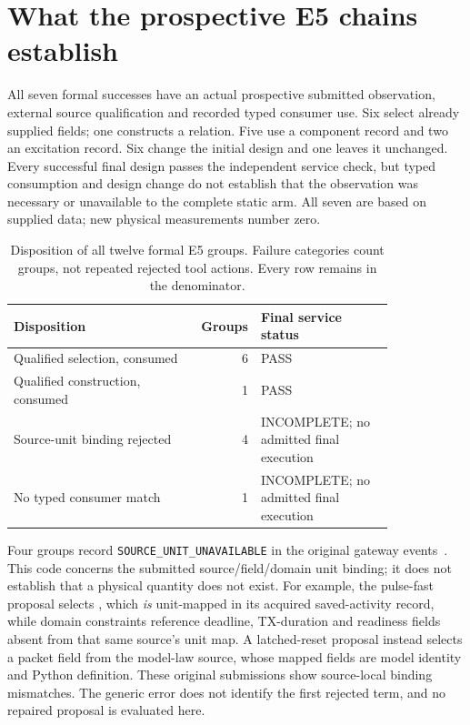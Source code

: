\section{What the prospective E5 chains establish}
All seven formal successes have an actual prospective submitted observation,
external source qualification and recorded typed consumer use. Six select
already supplied fields; one constructs a relation. Five use a component record
and two an excitation record. Six change the initial design and one leaves it
unchanged. Every successful final design passes the independent service check,
but typed consumption and design change do not establish that the observation
was necessary or unavailable to the complete static arm. All seven are based
on supplied data; new physical measurements number zero.

\begin{table}[htbp]
\centering\small
\caption{Disposition of all twelve formal E5 groups. Failure categories count
groups, not repeated rejected tool actions. Every row remains in the denominator.}
\label{tab:e5}
\begin{tabular}{@{}p{0.48\linewidth}rp{0.35\linewidth}@{}}\toprule
Disposition & Groups & Final service status \\\midrule
Qualified selection, consumed & 6 & PASS \\
Qualified construction, consumed & 1 & PASS \\
Source-unit binding rejected & 4 & INCOMPLETE; no admitted final execution \\
No typed consumer match & 1 & INCOMPLETE; no admitted final execution \\
\bottomrule\end{tabular}
\end{table}

Four groups record \texttt{SOURCE\_UNIT\_UNAVAILABLE} in the original
gateway events~\cite{gateways}. This code concerns the
submitted source/field/domain unit binding; it does not establish that a physical
quantity does not exist. For example, the pulse-fast proposal selects
, which \emph{is} unit-mapped in its acquired
saved-activity record, while domain constraints reference deadline, TX-duration
and readiness fields absent from that same source's unit map. A latched-reset
proposal instead selects a packet field from the model-law source, whose mapped
fields are model identity and Python definition. These original submissions
show source-local binding mismatches. The generic error does not identify the
first rejected term, and no repaired proposal is evaluated here.

